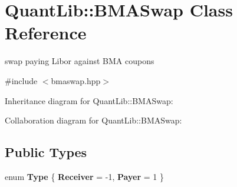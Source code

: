 \section{Quant\+Lib\+:\+:B\+M\+A\+Swap Class Reference}
\label{class_quant_lib_1_1_b_m_a_swap}


swap paying Libor against B\+MA coupons  




{\ttfamily \#include $<$bmaswap.\+hpp$>$}



Inheritance diagram for Quant\+Lib\+:\+:B\+M\+A\+Swap\+:


Collaboration diagram for Quant\+Lib\+:\+:B\+M\+A\+Swap\+:
\subsection*{Public Types}
\begin{DoxyCompactItemize}
\item 
enum {\bfseries Type} \{ {\bfseries Receiver} = -\/1, 
{\bfseries Payer} = 1
 \}\label{class_quant_lib_1_1_b_m_a_swap_aa6eb64defb099fe5623452e969daa6be}

\end{DoxyCompactItemize}
